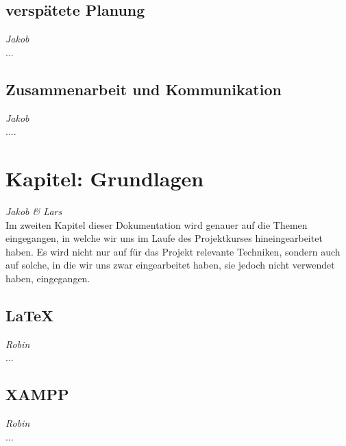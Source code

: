 \documentclass[12pt,a4paper,bibliography=totocnumbered,listof=totocnumbered]{scrartcl}
\begin{document}
\subsection{verspätete Planung}
\emph{Jakob}\\
...

\subsection{Zusammenarbeit und Kommunikation}
\emph{Jakob}\\
....

\pagebreak

\section{Kapitel: Grundlagen}
\emph{Jakob \emph{\&} Lars}\\
Im zweiten Kapitel dieser Dokumentation wird genauer auf die Themen eingegangen, in welche wir uns im Laufe des Projektkurses hineingearbeitet haben. Es wird nicht nur auf für das Projekt relevante Techniken, sondern auch auf solche, in die wir uns zwar eingearbeitet haben, sie jedoch nicht verwendet haben, eingegangen.

\subsection{\LaTeX{}}
\emph{Robin}\\
...

\subsection{XAMPP}
\emph{Robin}\\
...
\end{document}
